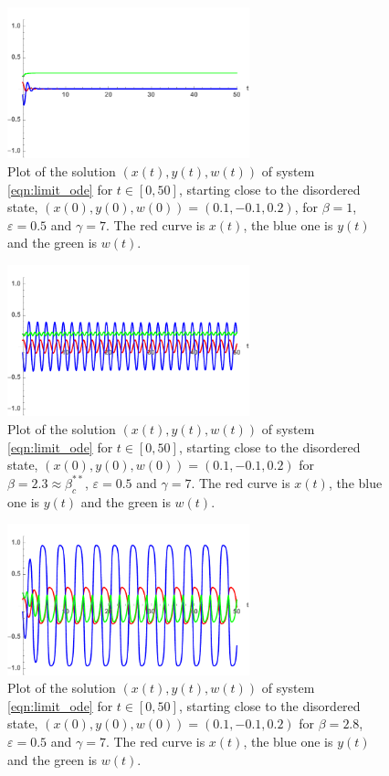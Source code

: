 \documentclass[a4paper,10pt,leqno]{amsart}
\theoremstyle{plain}
\begin{document}
\begin{figure}   
\centering   
\includegraphics[width=7cm]{ode_1d_b=1.pdf}   
\caption{Plot of the solution $(x(t),y(t),w(t))$ of system \eqref{eqn:limit_ode} for $t \in [0,50]$, starting close to the disordered state, $(x(0),y(0),w(0)) = (0.1,-0.1,0.2)$, for $\beta = 1$, $\varepsilon = 0.5$ and $\gamma = 7$. The red curve is $x(t)$, the blue one is $y(t)$ and the green is $w(t)$.}   
\label{grafico_sol_b=1}   
\end{figure}   

\begin{figure}   
\centering   
\includegraphics[width=7cm]{ode_1d_b=b**.pdf}   
\caption{Plot of the solution $(x(t),y(t),w(t))$ of system \eqref{eqn:limit_ode} for $t \in [0,50]$, starting close to the disordered state, $(x(0),y(0),w(0)) = (0.1,-0.1,0.2)$ for $\beta = 2.3 \approx \beta^{**}_c$, $\varepsilon = 0.5$ and $\gamma = 7$. The red curve is $x(t)$, the blue one is $y(t)$ and the green is $w(t)$.}   
\label{grafico_sol_b=b**}   
\end{figure}   

\begin{figure}   
\centering   
\includegraphics[width=7cm]{ode_1d_b=2_8.pdf}  
\caption{Plot of the solution $(x(t),y(t),w(t))$ of system \eqref{eqn:limit_ode} for $t \in [0,50]$, starting close to the disordered state, $(x(0),y(0),w(0)) = (0.1,-0.1,0.2)$ for $\beta = 2.8$, $\varepsilon = 0.5$ and $\gamma = 7$. The red curve is $x(t)$, the blue one is $y(t)$ and the green is $w(t)$.}   
\label{grafico_sol_b=2.8}   
\end{figure}   
\end{document}
